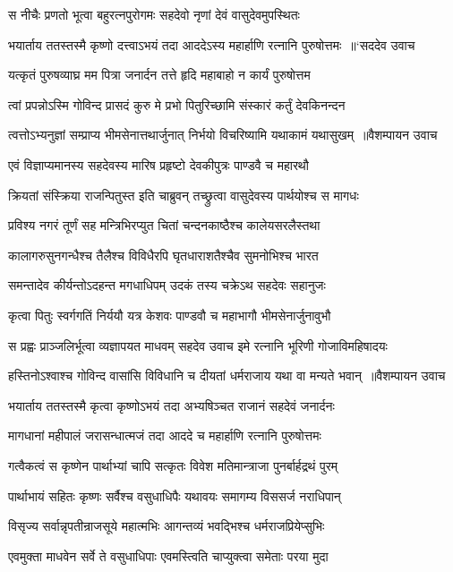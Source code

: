 \twolineshloka
{स नीचैः प्रणतो भूत्वा बहुरत्नपुरोगमः}
{सहदेवो नृणां देवं वासुदेवमुपस्थितः}


\threelineshloka
{भयार्ताय ततस्तस्मै कृष्णो दत्त्वाऽभयं तदा}
{आददेऽस्य महार्हाणि रत्नानि पुरुषोत्तमः ॥`सददेव उवाच}
{}


\twolineshloka
{यत्कृतं पुरुषव्याघ्र मम पित्रा जनार्दन}
{तत्ते हृदि महाबाहो न कार्यं पुरुषोत्तम}


\twolineshloka
{त्वां प्रपन्नोऽस्मि गोविन्द प्रासदं कुरु मे प्रभो}
{पितुरिच्छामि संस्कारं कर्तुं देवकिनन्दन}


\threelineshloka
{त्वत्तोऽभ्यनुज्ञां सम्प्राप्य भीमसेनात्तथार्जुनात्}
{निर्भयो विचरिष्यामि यथाकामं यथासुखम् ॥वैशम्पायन उवाच}
{}


\twolineshloka
{एवं विज्ञाप्यमानस्य सहदेवस्य मारिष}
{प्रहृष्टो देवकीपुत्रः पाण्डवै च महारथौ}


\twolineshloka
{क्रियतां संस्क्रिया राजन्पितुस्त इति चाब्रुवन्}
{तच्छ्रुत्वा वासुदेवस्य पार्थयोश्च स मागधः}


\twolineshloka
{प्रविश्य नगरं तूर्णं सह मन्त्रिभिरप्युत}
{चितां चन्दनकाष्ठैश्च कालेयसरलैस्तथा}


\twolineshloka
{कालागरुसुनगन्धैश्च तैलैश्च विविधैरपि}
{घृतधाराशतैश्चैव सुमनोभिश्च भारत}


\twolineshloka
{समन्तादेव कीर्यन्तोऽदहन्त मगधाधिपम्}
{उदकं तस्य चक्रेऽथ सहदेवः सहानुजः}


\twolineshloka
{कृत्वा पितुः स्वर्गगतिं निर्ययौ यत्र केशवः}
{पाण्डवौ च महाभागौ भीमसेनार्जुनावुभौ}


\threelineshloka
{स प्रह्वः प्राञ्जलिर्भूत्वा व्यज्ञापयत माधवम्}
{सहदेव उवाच}
{इमे रत्नानि भूरिणी गोजाविमहिषादयः}


\threelineshloka
{हस्तिनोऽश्वाश्च गोविन्द वासांसि विविधानि च}
{दीयतां धर्मराजाय यथा वा मन्यते भवान् ॥वैशम्पायन उवाच}
{}


\twolineshloka
{भयार्ताय ततस्तस्मै कृत्वा कृष्णोऽभयं तदा}
{अभ्यषिञ्चत राजानं सहदेवं जनार्दनः}


\twolineshloka
{मागधानां महीपालं जरासन्धात्मजं तदा}
{आददे च महार्हाणि रत्नानि पुरुषोत्तमः}


\twolineshloka
{गत्वैकत्वं स कृष्णेन पार्थाभ्यां चापि सत्कृतः}
{विवेश मतिमान्त्राजा पुनर्बार्हद्रथं पुरम्}


\twolineshloka
{पार्थाभायं सहितः कृष्णः सर्वैश्च वसुधाधिपैः}
{यथावयः समागम्य विससर्ज नराधिपान्}


\threelineshloka
{विसृज्य सर्वान्नृपतीन्राजसूये महात्मभिः}
{आगन्तव्यं भवद्भिश्च धर्मराजप्रियेप्सुभिः}
{}


\twolineshloka
{एवमुक्ता माधवेन सर्वे ते वसुधाधिपाः}
{एवमस्त्विति चाप्युक्त्वा समेताः परया मुदा}


